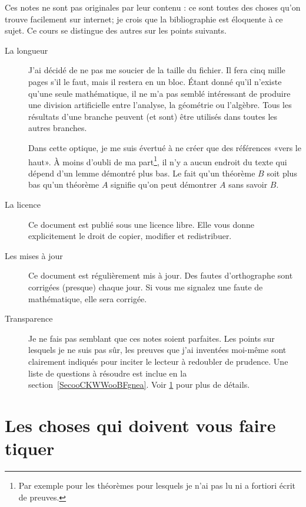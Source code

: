 Ces notes ne sont pas originales par leur contenu : ce sont toutes des choses qu'on trouve facilement sur internet; je crois que la bibliographie est éloquente à ce sujet. Ce cours se distingue des autres sur les points suivants.
\begin{description}
    \item[La longueur] J'ai décidé de ne pas me soucier de la taille du fichier. Il fera cinq mille pages s'il le faut, mais il restera en un bloc. Étant donné qu'il n'existe qu'une seule mathématique, il ne m'a pas semblé intéressant de produire une division artificielle entre l'analyse, la géométrie ou l'algèbre. Tous les résultats d'une branche peuvent (et sont) être utilisés dans toutes les autres branches.

        Dans cette optique, je me suis évertué à ne créer que des références «vers le haut». À moins d'oubli de ma part\footnote{Par exemple pour les théorèmes pour lesquels je n'ai pas lu ni a fortiori écrit de preuves.}, il n'y a aucun endroit du texte qui dépend d'un lemme démontré plus bas. Le fait qu'un théorème \( B\) soit plus bas qu'un théorème \( A\) signifie qu'on peut démontrer \( A\) sans savoir \( B\).

    \item[La licence] Ce document est publié sous une licence libre. Elle vous donne explicitement le droit de copier, modifier et redistribuer.

    \item[Les mises à jour] Ce document est régulièrement mis à jour. Des fautes d'orthographe sont corrigées (presque) chaque jour. Si vous me signalez une faute de mathématique, elle sera corrigée.
    \item[Transparence] Je ne fais pas semblant que ces notes soient parfaites. Les points sur lesquels je ne suis pas sûr, les preuves que j'ai inventées moi-même sont clairement indiqués pour inciter le lecteur à redoubler de prudence. Une liste de questions à résoudre est inclue en la section~\ref{SecooCKWWooBFgnea}. Voir \ref{SECooWVHBooCaYoXP} pour plus de détails.
\end{description}

\section{Les choses qui doivent vous faire tiquer}
\label{SECooWVHBooCaYoXP}

